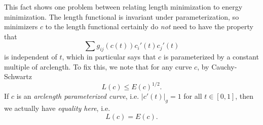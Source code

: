This fact shows one problem between relating length minimization to energy minimization. The length functional is invariant under parameterization, so minimizers $c$ to the length functional certainly do \emph{not} need to have the property that
%
\[ \sum g_{ij}(c(t)) c_i'(t) c_j'(t) \]
%
is independent of $t$, which in particular says that $c$ is parameterized by a constant multiple of arclength. To fix this, we note that for any curve $c$, by Cauchy-Schwartz
%
\[ L(c) \leq E(c)^{1/2}. \]
%
If $c$ is an \emph{arclength parameterized curve}, i.e. $|c'(t)|_g = 1$ for all $t \in [0,1]$, then we actually have \emph{equality here}, i.e.
%
\[ L(c) = E(c). \]
%
%
%
\begin{comment}
\begin{lemma}
    If $c: [0,1] \to M$ is a critical point for the energy function $E$, then $c$ is parameterized by a constant multiple of the arclength of $c$.
\end{lemma}
\begin{proof}
    By definition
    \[ \frac{\partial g_{ij}}{\partial x_l} = [il,j] + [jl,i]. \]
    Thus we calculate that
    \begin{align*}
        \frac{d}{dt} |c'|_g^2 &= \frac{d}{dt} \left( \sum_{i,j} g_{ij}(c(t)) c_i'(t) c_j'(t) \right)\\
        &= \sum_{i,j} \sum_l \frac{\partial g_{ij}}{\partial l}(c(t)) c_i'(t) c_j'(t) + 2 \sum_{i,j} g_{ij}(c(t)) c_i''(t) c_j'(t)\\
        &= \sum_{i,j} \sum_l \left( [il,j] + [jl,i] \right) c_i'(t) c_j'(t) + 2 \sum_{i,j} g_{ij}(c(t)) c_i''(t) c_j'(t).
    \end{align*}
    But the Euler-Lagrange equation tells us this quantity is zero.
\end{proof}
\end{comment}
